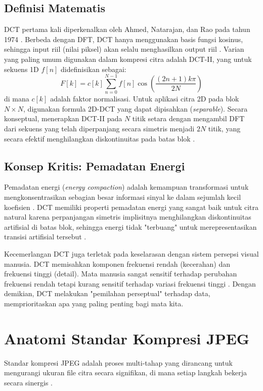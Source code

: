 \documentclass[a4paper]{article}
\begin{document}
\subsection{Definisi Matematis}
DCT pertama kali diperkenalkan oleh Ahmed, Natarajan, dan Rao pada tahun 1974 \cite{ahmed1974dct}. Berbeda dengan DFT, DCT hanya menggunakan basis fungsi kosinus, sehingga input riil (nilai piksel) akan selalu menghasilkan output riil \cite{ucsd_dct_notes}. Varian yang paling umum digunakan dalam kompresi citra adalah DCT-II, yang untuk sekuens 1D $f[n]$ didefinisikan sebagai:
\begin{equation} \label{eq:dct_1d}
  F[k] = c[k] \sum_{n=0}^{N-1} f[n] \cos\left(\frac{(2n+1)k\pi}{2N}\right)
\end{equation}
di mana $c[k]$ adalah faktor normalisasi. Untuk aplikasi citra 2D pada blok $N \times N$, digunakan formula 2D-DCT yang dapat dipisahkan (\textit{separable}). Secara konseptual, menerapkan DCT-II pada $N$ titik setara dengan mengambil DFT dari sekuens yang telah diperpanjang secara simetris menjadi $2N$ titik, yang secara efektif menghilangkan diskontinuitas pada batas blok \cite{ucsd_dct_notes}.

\subsection{Konsep Kritis: Pemadatan Energi}
Pemadatan energi (\textit{energy compaction}) adalah kemampuan transformasi untuk mengkonsentrasikan sebagian besar informasi sinyal ke dalam sejumlah kecil koefisien \cite{saab_transform_arxiv}. DCT memiliki properti pemadatan energi yang sangat baik untuk citra natural karena perpanjangan simetris implisitnya menghilangkan diskontinuitas artifisial di batas blok, sehingga energi tidak "terbuang" untuk merepresentasikan transisi artifisial tersebut \cite{ucsd_dct_notes, samsung2018heecn}.

Kecemerlangan DCT juga terletak pada keselarasan dengan sistem persepsi visual manusia. DCT memisahkan komponen frekuensi rendah (kecerahan) dan frekuensi tinggi (detail). Mata manusia sangat sensitif terhadap perubahan frekuensi rendah tetapi kurang sensitif terhadap variasi frekuensi tinggi \cite{wallace1991jpeg}. Dengan demikian, DCT melakukan "pemilahan perseptual" terhadap data, memprioritaskan apa yang paling penting bagi mata kita.

\section{Anatomi Standar Kompresi JPEG}
Standar kompresi JPEG adalah proses multi-tahap yang dirancang untuk mengurangi ukuran file citra secara signifikan, di mana setiap langkah bekerja secara sinergis \cite{wallace1991jpeg}.
\end{document}
